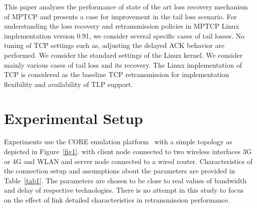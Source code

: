 \documentclass[10pt,conference,compsoc]{IEEEtran}
\begin{document}
This paper analyzes the performance of state of the art loss recovery mechanism of MPTCP and presents a case for improvement in the tail loss scenario. 
For understanding the loss recovery and retransmission policies in MPTCP Linux implementation version 0.91, we consider several specific cases of tail losses.  
No tuning of TCP settings such as, adjusting the delayed ACK behavior are performed. We consider the standard settings of the Linux kernel. We consider mainly various cases of tail loss and its recovery.
The Linux implementation of TCP is considered as the baseline TCP retransmission for implementation flexibility and availability of TLP support.

\section{Experimental Setup}\label{exsetup}

Experiments use the CORE emulation platform~\cite{CORE} with a simple topology as depicted in Figure~\ref{fig1}.
with client node connected to two wireless interfaces 3G or 4G and WLAN and server node connected to a wired router.
Characteristics of the connection setup and assumptions about the parameters are provided in Table~\ref{tab1}.
The parameters are chosen to be close to real values of bandwidth and delay of respective technologies.
There is no attempt in this study to focus on the effect of link detailed characteristics in retransmission performance.
\end{document}
